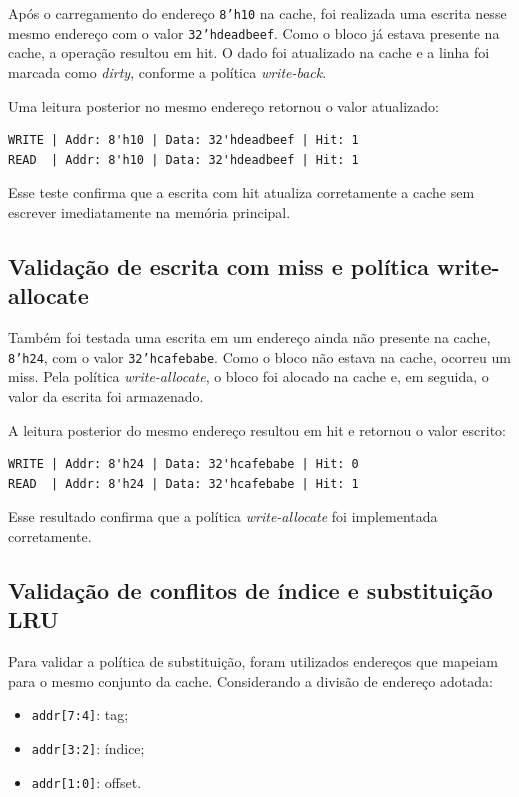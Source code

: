 ﻿\documentclass[12pt,a4paper]{article}
\begin{document}
Após o carregamento do endereço \texttt{8'h10} na cache, foi realizada uma escrita nesse mesmo endereço com o valor \texttt{32'hdeadbeef}. Como o bloco já estava presente na cache, a operação resultou em hit. O dado foi atualizado na cache e a linha foi marcada como \textit{dirty}, conforme a política \textit{write-back}.

Uma leitura posterior no mesmo endereço retornou o valor atualizado:

\begin{verbatim}
WRITE | Addr: 8'h10 | Data: 32'hdeadbeef | Hit: 1
READ  | Addr: 8'h10 | Data: 32'hdeadbeef | Hit: 1
\end{verbatim}

Esse teste confirma que a escrita com hit atualiza corretamente a cache sem escrever imediatamente na memória principal.

\subsection{Validação de escrita com miss e política write-allocate}

Também foi testada uma escrita em um endereço ainda não presente na cache, \texttt{8'h24}, com o valor \texttt{32'hcafebabe}. Como o bloco não estava na cache, ocorreu um miss. Pela política \textit{write-allocate}, o bloco foi alocado na cache e, em seguida, o valor da escrita foi armazenado.

A leitura posterior do mesmo endereço resultou em hit e retornou o valor escrito:

\begin{verbatim}
WRITE | Addr: 8'h24 | Data: 32'hcafebabe | Hit: 0
READ  | Addr: 8'h24 | Data: 32'hcafebabe | Hit: 1
\end{verbatim}

Esse resultado confirma que a política \textit{write-allocate} foi implementada corretamente.

\subsection{Validação de conflitos de índice e substituição LRU}

Para validar a política de substituição, foram utilizados endereços que mapeiam para o mesmo conjunto da cache. Considerando a divisão de endereço adotada:

\begin{itemize}
    \item \texttt{addr[7:4]}: tag;
    \item \texttt{addr[3:2]}: índice;
    \item \texttt{addr[1:0]}: offset.
\end{itemize}
\end{document}
